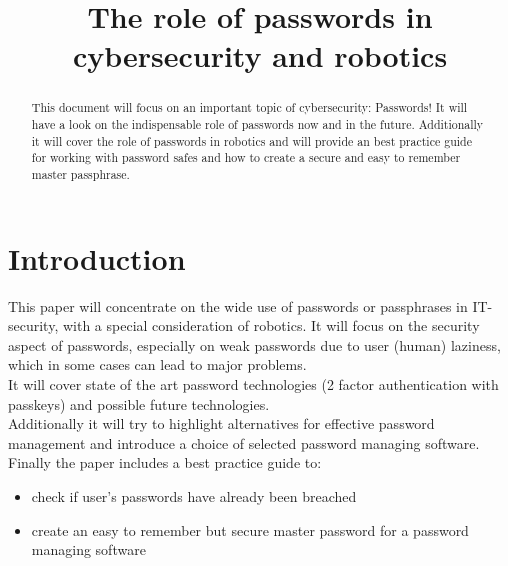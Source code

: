 \documentclass[conference]{IEEEtran}
\begin{document}
\title{The role of passwords in cybersecurity and robotics}
\author{
\and
{}
\and
{}
\and
{}
}
\maketitle

\begin{abstract}
This document will focus on an important topic of cybersecurity: Passwords! It will have a look on the indispensable role of passwords now and in the future. Additionally it will cover the role of passwords in robotics and will provide an best practice guide for working with password safes and how to create a secure and easy to remember master passphrase.

\end{abstract}


\section{Introduction}
This paper will concentrate on the wide use of passwords or passphrases in IT-security, with a special consideration of robotics. It will focus on the security aspect of passwords, especially on weak passwords due to user (human) laziness, which in some cases can lead to major problems. \\
It will cover state of the art password technologies (2 factor authentication with passkeys) and possible future technologies.\\
Additionally it will try to highlight alternatives for effective password management and introduce a choice of selected password managing software. \\
Finally the paper includes a best practice guide to:
\begin{itemize}
\item check if user's passwords have already been breached 
\item create an easy to remember but secure master password for a password managing software
\end{itemize} 
\end{document}
